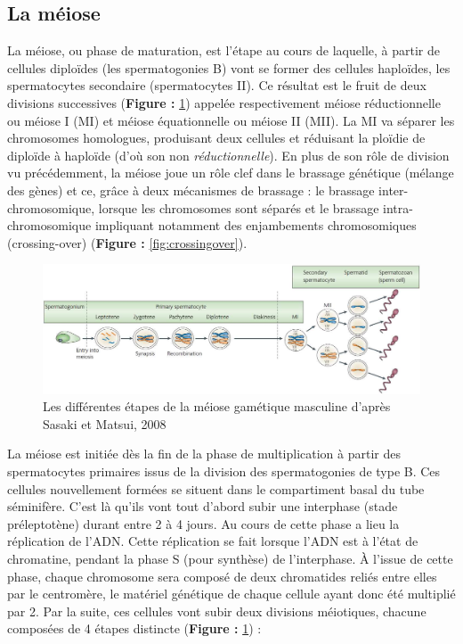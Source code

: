 \documentclass[12pt,twoside]{reedthesis}
\theoremstyle{definition}
\theoremstyle{definition}
\theoremstyle{remark}
\begin{document}
  \subsection{La méiose}\label{la-meiose}
  
  La méiose, ou phase de maturation, est l'étape au cours de laquelle, à
  partir de cellules diploïdes (les spermatogonies B) vont se former des
  cellules haploïdes, les spermatocytes secondaire (spermatocytes II). Ce
  résultat est le fruit de deux divisions successives (\textbf{Figure :
  }\ref{fig:meiose}) appelée respectivement méiose réductionnelle ou
  méiose I (MI) et méiose équationnelle ou méiose II (MII). La MI va
  séparer les chromosomes homologues, produisant deux cellules et
  réduisant la ploïdie de diploïde à haploïde (d'où son non
  \emph{réductionnelle}). En plus de son rôle de division vu précédemment,
  la méiose joue un rôle clef dans le brassage génétique (mélange des
  gènes) et ce, grâce à deux mécanismes de brassage : le brassage
  inter-chromosomique, lorsque les chromosomes sont séparés et le brassage
  intra-chromosomique impliquant notamment des enjambements chromosomiques
  (crossing-over) (\textbf{Figure : }\ref{fig:crossingover}).
  
  \begin{figure}
  
  {\centering \includegraphics[scale=0.33]{figure/Meiosis_Stages} 
  
  }
  
  \caption[Les différentes étapes de la méiose gamétique masculine]{Les différentes étapes de la méiose gamétique masculine d'après Sasaki et Matsui, 2008}\label{fig:meiose}
  \end{figure}
  
  La méiose est initiée dès la fin de la phase de multiplication à partir
  des spermatocytes primaires issus de la division des spermatogonies de
  type B. Ces cellules nouvellement formées se situent dans le
  compartiment basal du tube séminifère. C'est là qu'ils vont tout d'abord
  subir une interphase (stade préleptotène) durant entre 2 à 4 jours. Au
  cours de cette phase a lieu la réplication de l'ADN. Cette réplication
  se fait lorsque l'ADN est à l'état de chromatine, pendant la phase S
  (pour synthèse) de l'interphase. À l'issue de cette phase, chaque
  chromosome sera composé de deux chromatides reliés entre elles par le
  centromère, le matériel génétique de chaque cellule ayant donc été
  multiplié par 2. Par la suite, ces cellules vont subir deux divisions
  méiotiques, chacune composées de 4 étapes distincte (\textbf{Figure :
  }\ref{fig:meiose}) :
  
\end{document}

